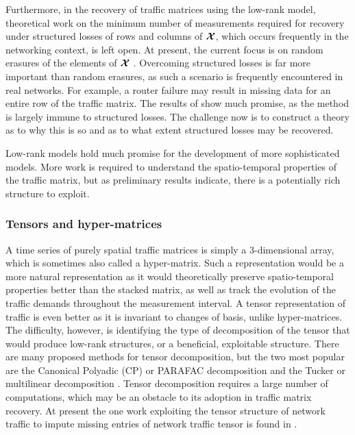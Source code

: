 Furthermore, in the recovery of traffic matrices using the low-rank
model, theoretical work on the minimum number of measurements required
for recovery under structured losses of rows and columns of $\boldsymbol{\mathcal{X}}$,
which occurs frequently in the networking context, is left open. At
present, the current focus is on random erasures of the elements of
$\boldsymbol{\mathcal{X}}$
\cite{CandesPlan09MtxNoise,CandesRecht08MtxComp,CandesTao09MtxComp,Recht07MtxComp}.
Overcoming structured losses is far more important than random
erasures, as such a scenario is frequently encountered in real
networks. For example, a router failure may result in missing data for
an entire row of the traffic matrix. The results of \cite{Zhang09TMCS}
show much promise, as the method is largely immune to structured
losses. The challenge now is to construct a theory as to why this is so and
as to what extent structured losses may be recovered.

Low-rank models hold much promise for the development of more
sophisticated models. More work is required to understand the
spatio-temporal properties of the traffic matrix, but as preliminary
results indicate, there is a potentially rich structure to exploit.

\subsubsection{Tensors and hyper-matrices}

A time series of purely spatial traffic matrices is simply a
3-dimensional array, which is sometimes also called a hyper-matrix. 
Such a representation would be a more natural representation
as it would theoretically preserve spatio-temporal properties better
than the stacked matrix, as well as track the evolution of the traffic
demands throughout the measurement interval. A tensor representation of
traffic is even better as it is invariant to changes of basis, unlike hyper-matrices.
The difficulty, however, is identifying the type of decomposition of the tensor that would
produce low-rank structures, or a beneficial, exploitable
structure. There are many proposed methods for tensor decomposition,
but the two most popular are the Canonical Polyadic (CP) or PARAFAC
decomposition and the Tucker or multilinear decomposition
\cite{Kolda09Tensor}. Tensor decomposition requires a large number of
computations, which may be an obstacle to its adoption in traffic
matrix recovery.  At present the one work exploiting the tensor structure
of network traffic to impute missing entries of network traffic tensor
is found in \cite{Acar10Tensor}.
